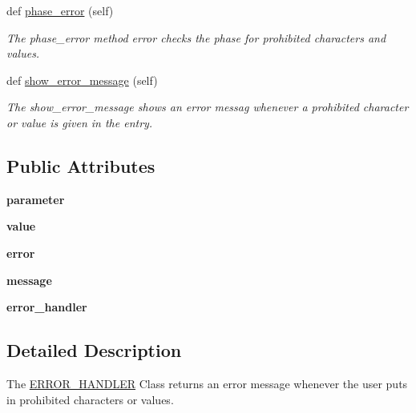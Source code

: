 \begin{DoxyCompactItemize}
def \hyperlink{classerror__handler_1_1ERROR__HANDLER_af7b3b222bae03ad07688a85f598d599e}{phase\+\_\+error} (self)
\begin{DoxyCompactList}\small\item\em The phase\+\_\+error method error checks the phase for prohibited characters and values. \end{DoxyCompactList}\item 
def \hyperlink{classerror__handler_1_1ERROR__HANDLER_ad71c2ba5b91d90294155fda388fd43bd}{show\+\_\+error\+\_\+message} (self)
\begin{DoxyCompactList}\small\item\em The show\+\_\+error\+\_\+message shows an error messag whenever a prohibited character or value is given in the entry. \end{DoxyCompactList}\end{DoxyCompactItemize}
\subsection*{Public Attributes}
\begin{DoxyCompactItemize}
\item 
\mbox{\label{classerror__handler_1_1ERROR__HANDLER_a7df184a7442379531cdb1f7142e8d528}} 
{\bfseries parameter}
\item 
\mbox{\label{classerror__handler_1_1ERROR__HANDLER_a23f882e61e3becc19c38e754dfcf28ff}} 
{\bfseries value}
\item 
\mbox{\label{classerror__handler_1_1ERROR__HANDLER_a0f12420c77458cbc00d7977dd0f8f8c1}} 
{\bfseries error}
\item 
\mbox{\label{classerror__handler_1_1ERROR__HANDLER_a8d03c457990b6bde4c4957874733f3de}} 
{\bfseries message}
\item 
\mbox{\label{classerror__handler_1_1ERROR__HANDLER_ae717c65071492af6051cb6ab50e3a57c}} 
{\bfseries error\+\_\+handler}
\end{DoxyCompactItemize}


\subsection{Detailed Description}
The \hyperlink{classerror__handler_1_1ERROR__HANDLER}{E\+R\+R\+O\+R\+\_\+\+H\+A\+N\+D\+L\+ER} Class returns an error message whenever the user puts in prohibited characters or values. 



